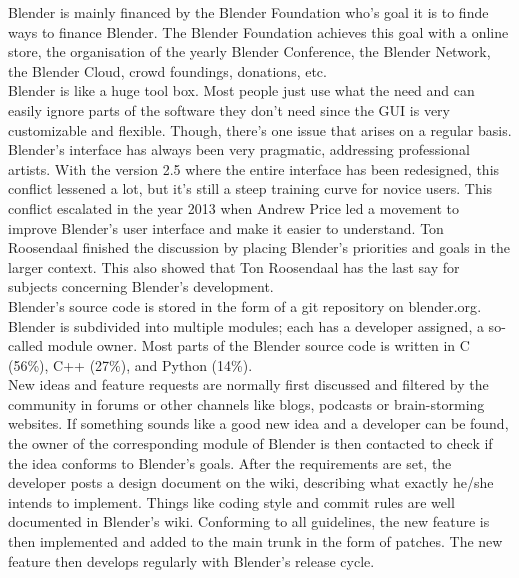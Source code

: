 Blender is mainly financed by the Blender Foundation who's goal it is to finde ways to finance Blender. The Blender Foundation achieves this goal with a online store\cite{blender-estore}, the organisation of the yearly Blender Conference\cite{blender-conference}, the Blender Network\cite{blender-network}, the Blender Cloud\cite{blender-cloud}, crowd foundings, donations\cite{blender-donate}, etc. \\

Blender is like a huge tool box. Most people just use what the need and can easily ignore parts of the software they don't need since the GUI is very customizable and flexible. Though, there's one issue that arises on a regular basis. Blender's interface has always been very pragmatic, addressing professional artists. With the version 2.5 where the entire interface has been redesigned, this conflict lessened a lot, but it's still a steep training curve for novice users. This conflict escalated in the year 2013 when Andrew Price led a movement to improve Blender's user interface and make it easier to understand.\cite{blender-guru-ui} Ton Roosendaal finished the discussion by placing Blender's priorities and goals in the larger context.\cite{blender-ton-ui} This also showed that Ton Roosendaal has the last say for subjects concerning Blender's development. \\

Blender's source code is stored in the form of a git repository on blender.org\cite{blender-repository}. Blender is subdivided into multiple modules; each has a developer assigned, a so-called module owner.\cite{blender-module-owners} Most parts of the Blender source code is written in C (56\%), C++ (27\%), and Python (14\%).\cite{blender-code-stat} \\

New ideas and feature requests are normally first discussed and filtered by the community in forums or other channels like blogs, podcasts or brain-storming websites.\cite{blender-community} If something sounds like a good new idea and a developer can be found, the owner of the corresponding module of Blender is then contacted to check if the idea conforms to Blender's goals. After the requirements are set, the developer posts a design document on the wiki, describing what exactly he/she intends to implement.\cite{blender-new-devs} Things like coding style\cite{blender-style-rules} and commit rules\cite{blender-new-devs} are well documented in Blender's wiki. Conforming to all guidelines, the new feature is then implemented and added to the main trunk in the form of patches. The new feature then develops regularly with Blender's release cycle.


